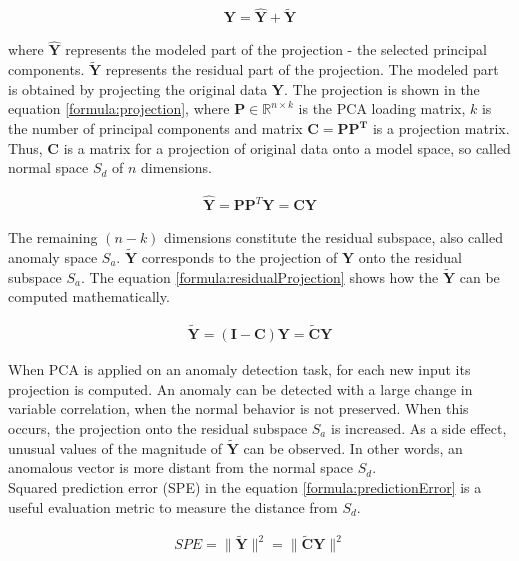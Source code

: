  \begin{gather}
     \mathbf{Y} = \mathbf{\hat{Y}} + \mathbf{\widetilde{Y}}
 \end{gather}
 
 where $\mathbf{\hat{Y}}$ represents the modeled part of the projection - the selected principal components. $\mathbf{\widetilde{Y}}$ represents the residual part of the projection. The modeled part is obtained by projecting the original data $\mathbf{{Y}}$. The projection is shown in the equation \ref{formula:projection}, where $\mathbf{P} \in \mathbb{R}^{n \times k}$ is the PCA loading matrix, $k$ is the number of principal components and matrix $\mathbf{C = \mathbf{PP}^T}$ is a projection matrix. Thus, $\mathbf{C}$ is a matrix for a projection of original data onto a model space, so called normal space $S_d$ of $n$ dimensions.

\begin{gather}
     \mathbf{\hat{Y}} = \mathbf{P}\mathbf{P}^T\mathbf{Y} = \mathbf{CY}
    \label{formula:projection}
\end{gather}

 The remaining $(n - k)$ dimensions constitute the residual subspace, also called anomaly space $S_a$. $\mathbf{\widetilde{Y}}$ corresponds to the projection of $\mathbf{Y}$ onto the residual subspace $S_a$. The equation \ref{formula:residualProjection} shows how the $\mathbf{\widetilde{Y}}$ can be computed mathematically.  
 
\begin{gather}
     \mathbf{\widetilde{Y}} = (\mathbf{I - C})\mathbf{Y} = \mathbf{\widetilde{C}Y}
    \label{formula:residualProjection}
\end{gather}
 
 When PCA is applied on an anomaly detection task, for each new input its projection is computed. An anomaly can be detected with a large change in variable correlation, when the normal behavior is not preserved. When this occurs, the projection onto the residual subspace $S_a$ is increased. As a side effect, unusual values of the magnitude of $\mathbf{\widetilde{Y}}$ can be observed. In other words, an anomalous vector is more distant from the normal space $S_d$.\\
 
 Squared prediction error (SPE) in the equation \ref{formula:predictionError} is a useful evaluation metric to measure the distance from $S_d$. 
 
 \begin{gather}
     SPE = \parallel \mathbf{\widetilde{Y}} \parallel^2  = \parallel \mathbf{\widetilde{C}Y} \parallel^2
    \label{formula:predictionError}
\end{gather}

